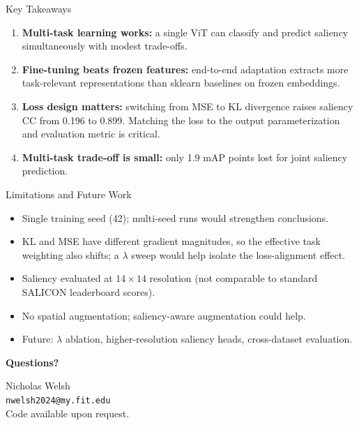 \documentclass{beamer}
\begin{document}
\begin{frame}{Key Takeaways}
\begin{enumerate}
  \item \textbf{Multi-task learning works:} a single ViT can classify and predict saliency simultaneously with modest trade-offs.
  \item \textbf{Fine-tuning beats frozen features:} end-to-end adaptation extracts more task-relevant representations than sklearn baselines on frozen embeddings.
  \item \textbf{Loss design matters:} switching from MSE to KL divergence raises saliency CC from 0.196 to 0.899. Matching the loss to the output parameterization and evaluation metric is critical.
  \item \textbf{Multi-task trade-off is small:} only 1.9 mAP points lost for joint saliency prediction.
\end{enumerate}
\end{frame}

\begin{frame}{Limitations and Future Work}
\begin{itemize}
  \item Single training seed (42); multi-seed runs would strengthen conclusions.
  \item KL and MSE have different gradient magnitudes, so the effective task weighting also shifts; a $\lambda$ sweep would help isolate the loss-alignment effect.
  \item Saliency evaluated at $14 \times 14$ resolution (not comparable to standard SALICON leaderboard scores).
  \item No spatial augmentation; saliency-aware augmentation could help.
  \item Future: $\lambda$ ablation, higher-resolution saliency heads, cross-dataset evaluation.
\end{itemize}
\end{frame}

\begin{frame}
\begin{center}
\Large\textbf{Questions?}

\vfill
\normalsize
Nicholas Welsh \\
\texttt{nwelsh2024@my.fit.edu} \\
\vspace{0.5cm}
Code available upon request.
\end{center}
\end{frame}
\end{document}
